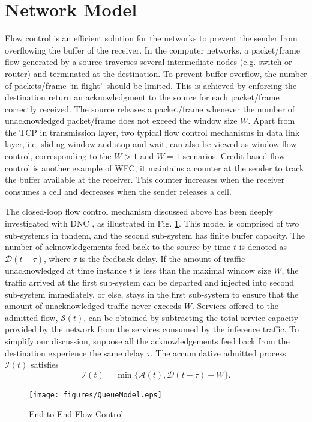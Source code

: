 \documentclass[paper]{ieice}
\begin{document}
\section{Network Model}\label{model}
Flow control is an efficient solution for the networks to prevent the sender from overflowing the buffer of the receiver. In the computer networks, a packet/frame flow generated by a source traverses several intermediate nodes (e.g. switch or router) and terminated at the destination. To prevent buffer overflow, the number of packets/frame \textquoteleft in flight\textquoteright\ should be limited. This is achieved by enforcing the destination return an acknowledgment to the source for each packet/frame correctly received. The source releases a packet/frame whenever the number of unacknowledged packet/frame does not exceed the window size $W$. Apart from the TCP \cite{RFC5681} in transmission layer, two typical flow control mechanisms in data link layer, i.e. sliding window and stop-and-wait, can also be viewed as window flow control, corresponding to the $W>1$ and $W=1$ scenarios. Credit-based flow control is another example of WFC, it maintains a counter at the sender to track the buffer available at the receiver. This counter increases when the receiver consumes a cell and decreases when the sender releases a cell.

The closed-loop flow control mechanism discussed above has been deeply investigated with DNC \cite{CrOk96,AgRa96,Chan98,ACOR99,QLDD09FC,bose2006analysis,Qian2010Analysis}, as illustrated in Fig. \ref{control}. This model is comprised of two sub-systems in tandem, and the second sub-system has finite buffer capacity. The number of acknowledgements feed back to the source by time $t$ is denoted as $\mathcal{D}(t-\tau)$, where $\tau$ is the feedback delay. If the amount of traffic unacknowledged at time instance $t$ is less than the maximal window size $W$, the traffic arrived at the first sub-system can be departed and injected into second sub-system immediately, or else, stays in the first sub-system to ensure that the amount of unacknowledged traffic never exceeds $W$. Services offered to the admitted flow, $\mathcal{S}(t)$, can be obtained by subtracting the total service capacity provided by the network from the services consumed by the inference traffic. To simplify our discussion, suppose all the acknowledgements feed back from the destination experience the same delay $\tau$. The accumulative admitted process $\mathcal{I}(t)$ satisfies
\begin{equation}\label{wfc}
\mathcal{I}(t)=\min\{\mathcal{A}(t),\mathcal{D}(t-\tau)+W\}.
\end{equation}
\begin{figure}[ht]
  \centering\texttt{[image: figures/QueueModel.eps]}\\
  \caption{End-to-End Flow Control}\label{control}
\end{figure}
\end{document}
